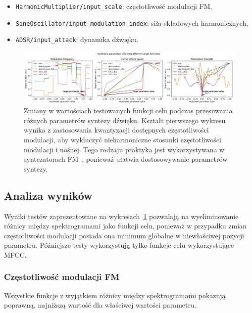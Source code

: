 \begin{itemize}
  \item \texttt{HarmonicMultiplier/input\_scale}: częstotliwość modulacji FM,
  \item \texttt{SineOscillator/input\_modulation\_index}: siła składowych harmonicznych,
  \item \texttt{ADSR/input\_attack}: dynamika dźwięku.
\end{itemize}


\begin{figure}[H]\label{fig:target_function_testing}
    \centering
    \includegraphics[width=1.0\linewidth]{rys03/target_function_testing.png}
    \caption{
      Zmiany w wartościach testowanych funkcji celu podczas przesuwania różnych parametrów syntezy dźwięku. 
      Kształt pierwszego wykresu wynika z zastosowania kwantyzacji dostępnych częstotliwości modulacji,
      aby wykluczyć nieharmoniczne stosunki częstotliwości modulacji i nośnej. Tego rodzaju praktyka
      jest wykorzystywana w syntezatorach FM~\cite{digitone_manual}, ponieważ ułatwia dostosowywanie parametrów syntezy.
    }
\end{figure}

\subsection{Analiza wyników}\label{sec:problem_crossection_results_analysis}

Wyniki testów zaprezentowane na wykresach~\ref{fig:target_function_testing} pozwalają na
wyeliminowanie różnicy między spektrogramami jako funkcji celu,
ponieważ w przypadku zmian częstotliwości modulacji posiada ona minimum globalne w 
niewłaściwej pozycji parametru. Późniejsze testy wykorzystują tylko funkcje celu
wykorzystujące MFCC\@.

\subsubsection{Częstotliwość modulacji FM}

Wszystkie funkcje z wyjątkiem różnicy między spektrogramami pokazują poprawną, 
najniższą wartość dla właściwej wartości parametru.

